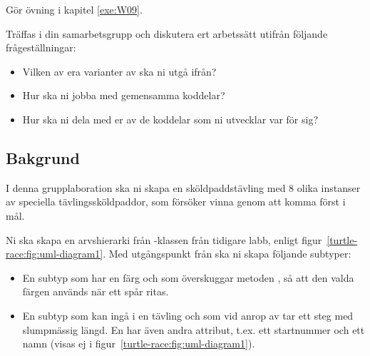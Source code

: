 

\Teamlab{\LabWeekNINE}

\begin{Goals}

\end{Goals}

\begin{Preparations}
\item Gör övning {\tt \ExeWeekNINE} i kapitel \ref{exe:W09}.

\item Träffas i din samarbetsgrupp och diskutera ert arbetssätt utifrån följande frågeställningar:
\begin{itemize}
  \item Vilken av era varianter av  ska ni utgå ifrån?
  \item Hur ska ni jobba med gemensamma koddelar?
  \item Hur ska ni dela med er av de koddelar som ni utvecklar var för sig?
\end{itemize}

\end{Preparations}

\subsection{Bakgrund}

I denna grupplaboration ska ni skapa en sköldpaddstävling med 8 olika instanser av speciella tävlingssköldpaddor, som försöker vinna genom att komma först i mål.

Ni ska skapa en arvshierarki från -klassen från tidigare labb, enligt figur~\ref{turtle-race:fig:uml-diagram1}.
Med utgångspunkt från  ska ni skapa följande subtyper:
\begin{itemize}
  \item En subtyp  som har en färg och som överskuggar metoden , så att den valda färgen används när ett spår ritas.
  \item En subtyp  som kan ingå i en tävling och som vid anrop av  tar ett steg med slumpmässig längd. En  har även andra attribut, t.ex. ett startnummer  och ett namn  (visas ej i figur~\ref{turtle-race:fig:uml-diagram1}).
\end{itemize}

